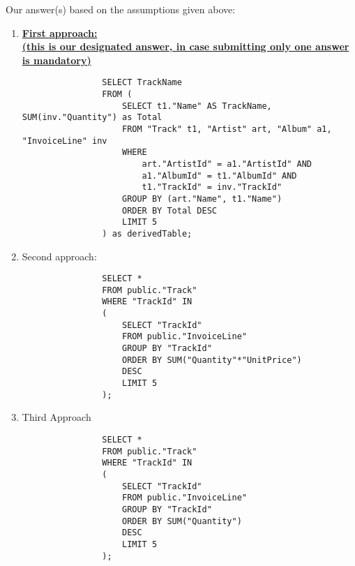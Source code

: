 \documentclass[10pt]{article}
\begin{document}
				
				
				\bigskip
			
			Our answer(s) based on the assumptions given above:
			
			\clearpage
			
			\begin{enumerate}
				\item \textbf{\underline{First approach: }} \\ \textbf{\underline{(this is our designated answer, in case submitting only one answer is mandatory)}}
				
				
				\begin{lstlisting}
				SELECT TrackName
				FROM (
					SELECT t1."Name" AS TrackName, SUM(inv."Quantity") as Total
					FROM "Track" t1, "Artist" art, "Album" a1, "InvoiceLine" inv
					WHERE
						art."ArtistId" = a1."ArtistId" AND
						a1."AlbumId" = t1."AlbumId" AND
						t1."TrackId" = inv."TrackId"
					GROUP BY (art."Name", t1."Name")
					ORDER BY Total DESC
					LIMIT 5
				) as derivedTable;
				\end{lstlisting}
				
				
				\item Second approach:
				\begin{lstlisting}
				SELECT *
				FROM public."Track"
				WHERE "TrackId" IN
				( 
					SELECT "TrackId"
					FROM public."InvoiceLine" 
					GROUP BY "TrackId" 
					ORDER BY SUM("Quantity"*"UnitPrice")
					DESC 
					LIMIT 5
				);
				\end{lstlisting}
				
				\item Third Approach
				\begin{lstlisting}
				SELECT *
				FROM public."Track"
				WHERE "TrackId" IN
				( 
					SELECT "TrackId"
					FROM public."InvoiceLine" 
					GROUP BY "TrackId" 
					ORDER BY SUM("Quantity")
					DESC 
					LIMIT 5
				);
				\end{lstlisting}
				
				
				
			\end{enumerate}
			
			
			
			
\end{document}
